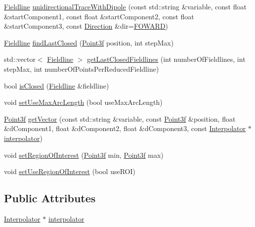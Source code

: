 \begin{DoxyCompactItemize}
\item 
\hyperlink{classccmc_1_1_fieldline}{Fieldline} \hyperlink{classccmc_1_1_tracer_a5f271069b9f92eafb9db48893ef19128}{unidirectional\-Trace\-With\-Dipole} (const std\-::string \&variable, const float \&start\-Component1, const float \&start\-Component2, const float \&start\-Component3, const \hyperlink{classccmc_1_1_tracer_a2c914b28e2e205cb1a7c01f2941fcae2}{Direction} \&dir=\hyperlink{classccmc_1_1_tracer_a2c914b28e2e205cb1a7c01f2941fcae2a133381f1178a2affb0f1c79a67b45e52}{F\-O\-W\-A\-R\-D})
\item 
\hyperlink{classccmc_1_1_fieldline}{Fieldline} \hyperlink{classccmc_1_1_tracer_a214b139e1f6a0a81f95745eb1b4ab0f2}{find\-Last\-Closed} (\hyperlink{classccmc_1_1_point3f}{Point3f} position, int step\-Max)
\item 
std\-::vector$<$ \hyperlink{classccmc_1_1_fieldline}{Fieldline} $>$ \hyperlink{classccmc_1_1_tracer_ab25c61cccde5b4043732ed3b146d137d}{get\-Last\-Closed\-Fieldlines} (int number\-Of\-Fieldlines, int step\-Max, int number\-Of\-Points\-Per\-Reduced\-Fieldline)
\item 
bool \hyperlink{classccmc_1_1_tracer_aee62bc5b0bb724545d1fd32ae2af343f}{is\-Closed} (\hyperlink{classccmc_1_1_fieldline}{Fieldline} \&fieldline)
\item 
void \hyperlink{classccmc_1_1_tracer_aec22644edb73716c0be90a8aad3f9bdb}{set\-Use\-Max\-Arc\-Length} (bool use\-Max\-Arc\-Length)
\item 
\hyperlink{classccmc_1_1_point3f}{Point3f} \hyperlink{classccmc_1_1_tracer_a533ed52b1386402f83225c2fd81b8c40}{get\-Vector} (const std\-::string \&variable, const \hyperlink{classccmc_1_1_point3f}{Point3f} \&position, float \&d\-Component1, float \&d\-Component2, float \&d\-Component3, const \hyperlink{classccmc_1_1_interpolator}{Interpolator} $\ast$\hyperlink{classccmc_1_1_tracer_ae7a4953e9ca43eb93535b869864f6062}{interpolator})
\item 
void \hyperlink{classccmc_1_1_tracer_a1978e6bc32b29821fcd8d673182da7c9}{set\-Region\-Of\-Interest} (\hyperlink{classccmc_1_1_point3f}{Point3f} min, \hyperlink{classccmc_1_1_point3f}{Point3f} max)
\item 
void \hyperlink{classccmc_1_1_tracer_adeeddca01155c69abfdd85711e049568}{set\-Use\-Region\-Of\-Interest} (bool use\-R\-O\-I)
\end{DoxyCompactItemize}
\subsection*{Public Attributes}
\begin{DoxyCompactItemize}
\item 
\hyperlink{classccmc_1_1_interpolator}{Interpolator} $\ast$ \hyperlink{classccmc_1_1_tracer_ae7a4953e9ca43eb93535b869864f6062}{interpolator}
\end{DoxyCompactItemize}



